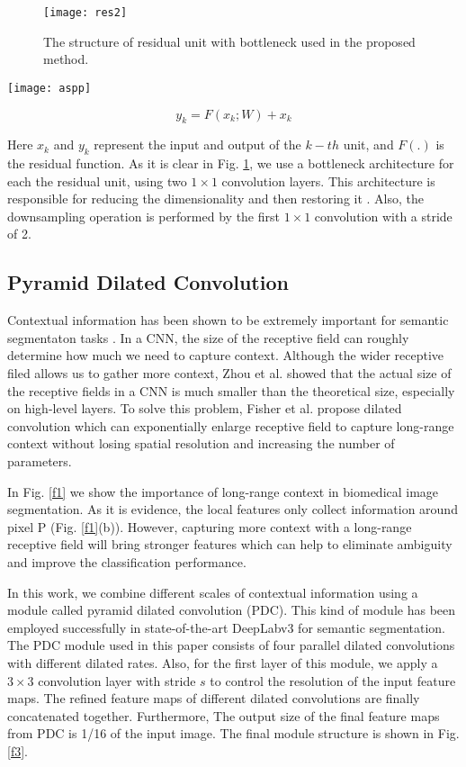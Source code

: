 \documentclass[10pt,twocolumn]{article}
\begin{document}
\begin{figure}[t]
\centering
\texttt{[image: res2]}
\caption{The structure of residual unit with bottleneck used in the proposed method.}
\label{f2}
\end{figure}

\begin{figure*}[h]
\centering
\texttt{[image: aspp]}
\caption{Pyramid Dilated Convolution (PDC) module structure.}  \label{f3}
\end{figure*}

\begin{equation}
  y_{k}=F(x_{k};W)+x_{k}
\end{equation}

Here $x_{k}$ and $y_{k}$ represent the input and output of the $k-th$ unit, and $F(.)$ is the residual function.
As it is clear in Fig. \ref{f2}, we use a bottleneck architecture for each the residual unit, using two $1\times1$  convolution layers. This architecture is responsible for reducing the dimensionality and then restoring it \cite{r9}.
Also, the downsampling operation is performed by the first $1\times1$ convolution with a stride of 2.

\subsection{Pyramid Dilated Convolution}
\label{s32}
Contextual information has been shown to be extremely important for semantic segmentaton tasks \cite{r12,r13}.
In a CNN, the size of the receptive field can roughly determine how much we need to capture context. Although the wider receptive filed allows us to gather more context, Zhou et al. \cite{r15} showed that the actual size of the receptive fields in a CNN is much smaller than the theoretical size, especially on high-level layers.
To solve this problem, Fisher et al. \cite{r16} propose dilated convolution which can exponentially enlarge receptive field to capture long-range context without losing spatial resolution and increasing the number of parameters.

In Fig. \ref{f1} we show the importance of long-range context in biomedical image segmentation. As it is evidence, the local features only collect information around pixel P (Fig. \ref{f1}(b)). However, capturing more context with a long-range receptive field will bring stronger features which can help to eliminate ambiguity and improve the classification performance.

In this work, we combine different scales of contextual information using a module called pyramid dilated convolution (PDC). This kind of module has been employed successfully in state-of-the-art DeepLabv3 \cite{r10} for semantic segmentation. The PDC module used in this paper consists of four parallel dilated convolutions with different dilated rates. Also, for the first layer of this module, we apply a $3\times3$ convolution layer with stride $s$ to control the resolution of the input feature maps. The refined feature maps of different dilated convolutions are finally concatenated together. Furthermore, The output size of the final feature maps from PDC is 1/16 of the input image. The final module structure is shown in Fig. \ref{f3}.
\end{document}
